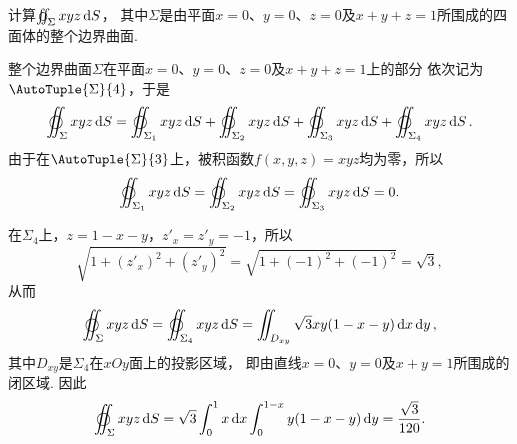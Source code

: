 \begin{example}
计算\(\varoiint_\Sigma xyz \dd{S}\)，
其中\(\Sigma\)是由平面\(x=0\)、\(y=0\)、\(z=0\)及\(x+y+z=1\)所围成的四面体的整个边界曲面.
\begin{solution}
整个边界曲面\(\Sigma\)在平面\(x=0\)、\(y=0\)、\(z=0\)及\(x+y+z=1\)上的部分
依次记为\(\AutoTuple{\Sigma}{4}\)，于是\[
	\varoiint_\Sigma xyz \dd{S}
	= \varoiint_{\Sigma_1} xyz \dd{S}
	+ \varoiint_{\Sigma_2} xyz \dd{S}
	+ \varoiint_{\Sigma_3} xyz \dd{S}
	+ \varoiint_{\Sigma_4} xyz \dd{S}.
\]
由于在\(\AutoTuple{\Sigma}{3}\)上，被积函数\(f(x,y,z)=xyz\)均为零，所以\[
	\varoiint_{\Sigma_1} xyz \dd{S}
	= \varoiint_{\Sigma_2} xyz \dd{S}
	= \varoiint_{\Sigma_3} xyz \dd{S}
	= 0.
\]

在\(\Sigma_4\)上，\(z=1-x-y\)，\(z'_x = z'_y = -1\)，所以\[
	\sqrt{1+(z'_x)^2+(z'_y)^2}
	= \sqrt{1+(-1)^2+(-1)^2}
	= \sqrt{3},
\]
从而\[
	\varoiint_\Sigma xyz \dd{S}
	= \varoiint_{\Sigma_4} xyz \dd{S}
	= \iint_{D_{xy}} \sqrt{3} xy (1-x-y) \dd{x} \dd{y},
\]
其中\(D_{xy}\)是\(\Sigma_4\)在\(xOy\)面上的投影区域，
即由直线\(x=0\)、\(y=0\)及\(x+y=1\)所围成的闭区域.
因此\[
	\varoiint_\Sigma xyz \dd{S}
	= \sqrt{3} \int_0^1 x \dd{x} \int_0^{1-x} y (1-x-y) \dd{y}
	= \frac{\sqrt{3}}{120}.
\]
\end{solution}
\end{example}

